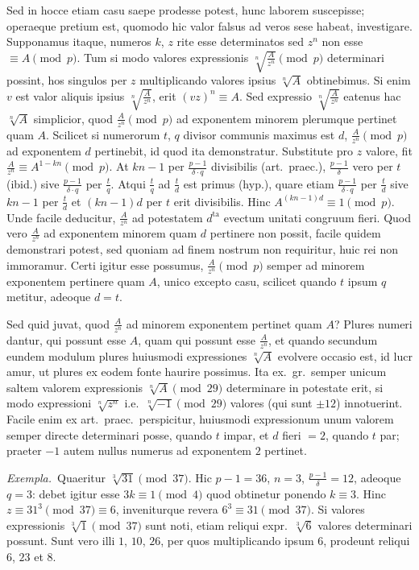 \documentclass[12pt,a4paper]{article}
\theoremstyle{plain}
\theoremstyle{definition}
\theoremstyle{remark}
\begin{document}
Sed in hocce etiam casu saepe prodesse potest, hunc laborem suscepisse; operaeque pretium est, quomodo hic valor falsus ad veros sese habeat, investigare. Supponamus itaque, numeros $k$, $z$ rite esse determinatos sed $z^n$ non esse $\equiv A \pmod{p}$. Tum si modo valores expressionis $\sqrt[n]{\frac{A}{z^n}} \pmod{p}$ determinari possint, hos singulos per $z$ multiplicando valores ipsius $\sqrt[n]{A}$ obtinebimus. Si enim $v$ est valor aliquis ipsius $\sqrt[n]{\frac{A}{z^n}}$, erit $(vz)^n \equiv A$. Sed expressio $\sqrt[n]{\frac{A}{z^n}}$ eatenus hac $\sqrt[n]{A}$ simplicior, quod $\frac{A}{z^n} \pmod{p}$ ad exponentem minorem plerumque pertinet quam $A$. Scilicet si numerorum $t$, $q$ divisor communis maximus est $d$, $\frac{A}{z^n} \pmod{p}$ ad exponentem $d$ pertinebit, id quod ita demonstratur. Substitute pro $z$ valore, fit $\frac{A}{z^n} \equiv A^{1-kn} \pmod{p}$. At $kn - 1$ per $\frac{p-1}{\delta \cdot q}$ divisibilis (art.\ praec.), $\frac{p-1}{\delta}$ vero per $t$ (ibid.) sive $\frac{p-1}{\delta \cdot q}$ per $\frac{t}{q}$. Atqui $\frac{t}{q}$ ad $\frac{t}{d}$ est primus (hyp.), quare etiam $\frac{p-1}{\delta \cdot q}$ per $\frac{t}{d}$ sive $kn-1$ per $\frac{t}{d}$ et $(kn-1)d$ per $t$ erit divisibilis. Hinc $A^{(kn-1)d} \equiv 1 \pmod{p}$. Unde facile deducitur, $\frac{A}{z^n}$ ad potestatem $d^\text{ta}$ evectum unitati congruum fieri. Quod vero $\frac{A}{z^n}$ ad exponentem minorem quam $d$ pertinere non possit, facile quidem demonstrari potest, sed quoniam ad finem nostrum non requiritur, huic rei non immoramur. Certi igitur esse possumus, $\frac{A}{z^n} \pmod{p}$ semper ad minorem exponentem pertinere quam $A$, unico excepto casu, scilicet quando $t$ ipsum $q$ metitur, adeoque $d = t$.

Sed quid juvat, quod $\frac{A}{z^n}$ ad minorem exponentem pertinet quam $A$? Plures numeri dantur, qui possunt esse $A$, quam qui possunt esse $\frac{A}{z^n}$, et quando secundum eundem modulum plures huiusmodi expressiones $\sqrt[n]{A}$ evolvere occasio est, id lucr amur, ut plures ex eodem fonte haurire possimus. Ita ex.\ gr.\ semper unicum saltem valorem expressionis $\sqrt[n]{A} \pmod{29}$ determinare in potestate erit, si modo expressioni $\sqrt[n]{z^n}$ i.e.\ $\sqrt[n]{-1} \pmod{29}$ valores (qui sunt $\pm 12$) innotuerint. Facile enim ex art.\ praec.\ perspicitur, huiusmodi expressionum unum valorem semper directe determinari posse, quando $t$ impar, et $d$ fieri $= 2$, quando $t$ par; praeter $-1$ autem nullus numerus ad exponentem $2$ pertinet.

\textit{Exempla.}\ Quaeritur $\sqrt[3]{31} \pmod{37}$. Hic $p-1 = 36$, $n = 3$, $\frac{p-1}{\delta} = 12$, adeoque $q = 3$: debet igitur esse $3k \equiv 1 \pmod{4}$ quod obtinetur ponendo $k \equiv 3$. Hinc $z \equiv 31^3 \pmod{37} \equiv 6$, inveniturque revera $6^3 \equiv 31 \pmod{37}$. Si valores expressionis $\sqrt[3]{1} \pmod{37}$ sunt noti, etiam reliqui expr.\ $\sqrt[3]{6}$ valores determinari possunt. Sunt vero illi $1$, $10$, $26$, per quos multiplicando ipsum $6$, prodeunt reliqui $6$, $23$ et $8$.
\end{document}
